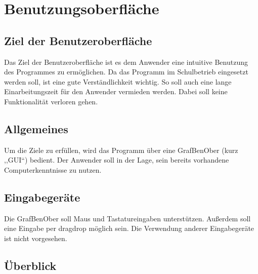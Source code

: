 \documentclass[parskip=full]{scrartcl}
\begin{document}
\clearpage
\section{Benutzungsoberfläche}\label{gui}

\subsection{Ziel der Benutzeroberfläche}

Das Ziel der Benutzeroberfläche ist es dem Anwender eine intuitive Benutzung des Programmes zu ermöglichen. Da das Programm im Schulbetrieb eingesetzt werden soll, ist eine gute Verständlichkeit wichtig. So soll auch eine lange Einarbeitungszeit für den Anwender vermieden werden. Dabei soll keine Funktionalität verloren gehen.

\subsection{Allgemeines}

Um die Ziele zu erfüllen, wird das Programm über eine \gls{GrafBenOber} (kurz ,,GUI``) bedient. Der Anwender soll in der Lage, sein bereits vorhandene Computerkenntnisse zu nutzen.

\subsection{Eingabegeräte}

Die \gls{GrafBenOber} soll Maus und Tastatureingaben unterstützen. Außerdem soll eine Eingabe per \gls{dragdrop} möglich sein.
Die Verwendung anderer Eingabegeräte ist nicht vorgesehen.

\subsection{Überblick}
\end{document}
